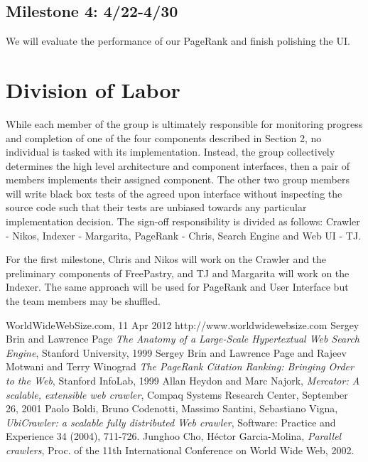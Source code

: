 \documentclass[11pt, letterpaper, oneside, twocolumn]{article}
\begin{document}
\subsection{Milestone 4: 4/22-4/30}
We will evaluate the performance of our PageRank and finish polishing the UI. 


\section{ Division of Labor }
\label{sec:labor}

While each member of the group is ultimately responsible for monitoring progress and completion of one of the four components described in Section 2, no individual is tasked with its implementation.  Instead, the group collectively determines the high level architecture and component interfaces, then a pair of members implements their assigned component.  The other two group members will write black box tests of the agreed upon interface without inspecting the source code such that their tests are unbiased towards any particular implementation decision. The sign-off responsibility is divided as follows: Crawler - Nikos, Indexer - Margarita, PageRank - Chris, Search Engine and Web UI - TJ.

For the first milestone, Chris and Nikos will work on the Crawler and the preliminary components of FreePastry, and TJ and Margarita will work on the Indexer. The same approach will be used for PageRank and User Interface but the team members may be shuffled.

\begin{thebibliography}{9}

   WorldWideWebSize.com, 11 Apr 2012 \langle http://www.worldwidewebsize.com \rangle
   Sergey Brin and Lawrence Page \emph{The Anatomy of a Large-Scale Hypertextual Web Search Engine}, Stanford University, 1999
   Sergey Brin and  Lawrence Page and Rajeev Motwani and Terry Winograd \emph{The PageRank Citation Ranking: Bringing Order to the Web}, Stanford InfoLab, 1999
   Allan Heydon and Marc Najork, \emph{Mercator: A scalable, extensible web crawler}, Compaq Systems Research Center, September 26, 2001
   Paolo Boldi, Bruno Codenotti, Massimo Santini, Sebastiano Vigna, \emph{UbiCrawler: a scalable fully distributed Web crawler}, Software: Practice and Experience 34 (2004), 711-726.
   Junghoo Cho, Héctor Garcia-Molina, \emph{Parallel crawlers}, Proc. of the 11th International Conference on World Wide Web, 2002.


\end{thebibliography}
\end{document}
